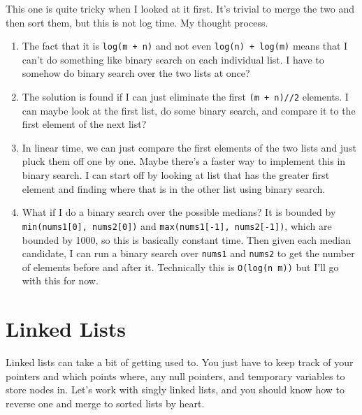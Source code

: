 \documentclass{article}
\begin{document}
  \begin{example}
    This one is quite tricky when I looked at it first. It's trivial to merge the two and then sort them, but this is not log time. My thought process. 
    \begin{enumerate}
      \item The fact that it is \texttt{log(m + n)} and not even \texttt{log(n) + log(m)} means that I can't do something like binary search on each individual list. I have to somehow do binary search over the two lists at once? 
      \item The solution is found if I can just eliminate the first \texttt{(m + n)//2} elements. I can maybe look at the first list, do some binary search, and compare it to the first element of the next list? 
      \item In linear time, we can just compare the first elements of the two lists and just pluck them off one by one. Maybe there's a faster way to implement this in binary search. I can start off by looking at list that has the greater first element and finding where that is in the other list using binary search. 
      \item What if I do a binary search over the possible medians? It is bounded by \texttt{min(nums1[0], nums2[0])} and \texttt{max(nums1[-1], nums2[-1])}, which are bounded by 1000, so this is basically constant time. Then given each median candidate, I can run a binary search over \texttt{nums1} and \texttt{nums2} to get the number of elements before and after it. Technically this is \texttt{O(log(n m))} but I'll go with this for now. 
    \end{enumerate}
  \end{example}

\section{Linked Lists}

Linked lists can take a bit of getting used to. You just have to keep track of your pointers and which points where, any null pointers, and temporary variables to store nodes in. Let's work with singly linked lists, and you should know how to reverse one and merge to sorted lists by heart. 
\end{document}
